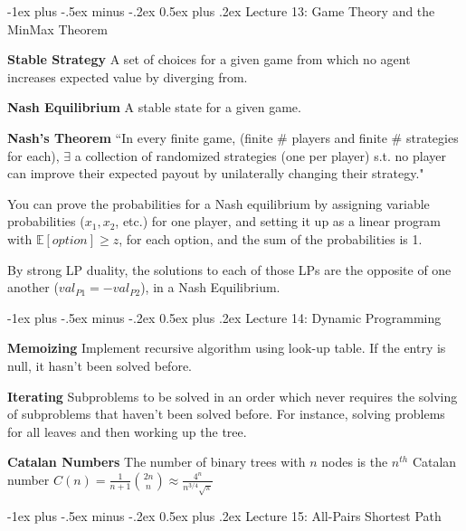 \documentclass[10pt,landscape]{article}
\makeatletter
\renewcommand{\section}{\@startsection{section}{1}{0mm}%
                                {-1ex plus -.5ex minus -.2ex}%
                                {0.5ex plus .2ex}%
                                {\normalfont\large\bfseries}}
\newcommand{\definition}[1]{\textbf{#1}\hspace{2pt}}
\makeatother
\begin{document}
\begin{multicols}{3}
\section{Lecture 13: Game Theory and the MinMax Theorem}

\definition{Stable Strategy} A set of choices for a given game from which no agent increases expected value by diverging from.

\definition{Nash Equilibrium} A stable state for a given game.

\definition{Nash's Theorem} ``In every finite game, (finite \# players and finite \# strategies for each), $\exists$ a collection of randomized strategies (one per player) s.t. no player can improve their expected payout by unilaterally changing their strategy."

You can prove the probabilities for a Nash equilibrium by assigning variable probabilities ($x_1, x_2$, etc.) for one player, and setting it up as a linear program with $\mathds{E}[option] \geq z$, for each option, and the sum of the probabilities is 1.

By strong LP duality, the solutions to each of those LPs are the opposite of one another ($val_{P1} = -val_{P2}$), in a Nash Equilibrium.



\section{Lecture 14: Dynamic Programming}

\definition{Memoizing} Implement recursive algorithm using look-up table. If the entry is null, it hasn't been solved before.

\definition{Iterating} Subproblems to be solved in an order which never requires the solving of subproblems that haven't been solved before. For instance, solving problems for all leaves and then working up the tree.

\definition{Catalan Numbers} The number of binary trees with $n$ nodes is the $n^{th}$ Catalan number $C(n) = \frac{1}{n+1} \binom{2n}{n} \approx \frac{4^n}{n^{3/4} \sqrt{\pi}}$



\section{Lecture 15: All-Pairs Shortest Path}


\end{multicols}
\end{document}
